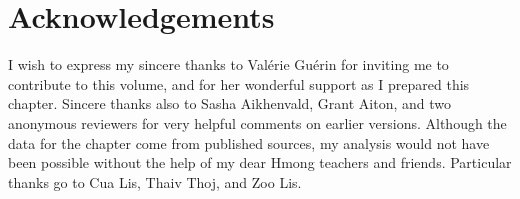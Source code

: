 \documentclass[output=paper]{LSP/langsci}
\begin{document}
\section*{Acknowledgements}
I wish to express my sincere thanks to Valérie Guérin for inviting me to contribute to
this volume, and for her wonderful support as I prepared this chapter. Sincere thanks
also to Sasha Aikhenvald, Grant Aiton, and two anonymous reviewers for very helpful
comments on earlier versions. Although the data for the chapter come from published
sources, my analysis would not have been possible without the help of my dear Hmong
teachers and friends. Particular thanks go to Cua Lis, Thaiv Thoj, and Zoo Lis.

\printbibliography[heading=subbibliography,notkeyword=this] 
\end{document}
